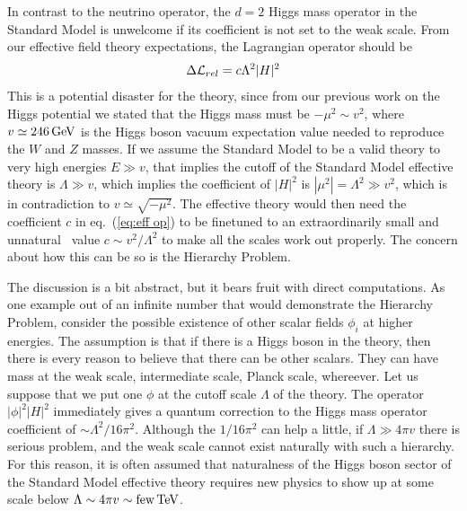 \documentclass[12pt]{article}
\def\beq{\begin{eqnarray}}
\def\eeq{\end{eqnarray}}
\def\tev{\, {\rm TeV}}
\def\gev{\, {\rm GeV}}
\def\eq#1{eq.~(\ref{#1})}
\begin{document}
In contrast to the neutrino operator, the $d=2$ Higgs mass operator in the Standard Model is unwelcome if its coefficient is not set to the weak scale. From our effective field theory expectations, the Lagrangian operator  should be
\beq
\Delta {\cal L}_{rel}=c\Lambda^2 |H|^2
\label{eq:eff op}
\eeq
This is a potential disaster for the theory, since from our previous work on the Higgs potential we stated that the Higgs mass must be  $-\mu^2\sim v^2$, where $v\simeq 246\gev$ is the Higgs boson vacuum expectation value needed to reproduce the $W$ and $Z$ masses. If we assume the Standard Model to be a valid theory to very high energies $E\gg v$, that implies the cutoff of the Standard Model effective theory is $\Lambda\gg v$, which implies the coefficient of $|H|^2$ is $|\mu^2|=\Lambda^2\gg v^2$, which is in contradiction to $v\simeq \sqrt{-\mu^2}$.  The effective theory would then need the coefficient $c$ in \eq{eq:eff op} to be finetuned to an extraordinarily small and unnatural~\cite{Giudice:2008bi} value $c\sim v^2/\Lambda^2$ to make all the scales work out properly. The concern about how this can be so is the Hierarchy Problem.

The discussion is a bit abstract, but it bears fruit with direct computations. As one example out of an infinite number that would demonstrate the Hierarchy Problem, consider the possible existence of other scalar fields $\phi_i$ at higher energies. The assumption is that if there is a Higgs boson in the theory, then there is every reason to believe that there can be other scalars. They can have mass at the weak scale, intermediate scale, Planck scale, whereever.  Let us suppose that we put one $\phi$ at the cutoff scale $\Lambda$ of the theory. The operator $|\phi|^2|H|^2$ immediately gives a quantum correction to the Higgs mass operator coefficient of $\sim \Lambda^2/16\pi^2$. Although the $1/16\pi^2$ can help a little, if $\Lambda \gg 4\pi v$ there is serious problem, and the weak scale cannot exist naturally with such a hierarchy.  For this reason, it is often assumed that naturalness of the Higgs boson sector of the Standard Model effective theory requires new physics to show up at some scale below $\Lambda\sim 4\pi v\sim {\rm few}\tev$.
\end{document}
